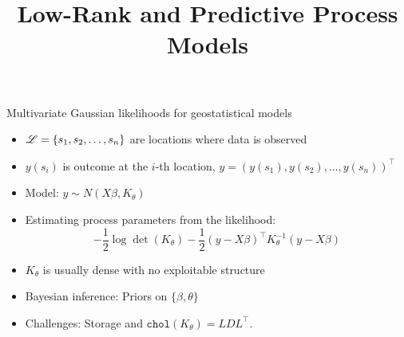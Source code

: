 





\title[]{Low-Rank and Predictive Process Models}




\maketitle


\begin{frame}{Multivariate Gaussian likelihoods for geostatistical models}

 \begin{itemize}\setlength{\itemsep}{0.4cm}
  \item ${\cal L}=\{s_1,s_2,\ldots,s_n\}$ are locations where data is observed
  \item $y(s_i)$ is outcome at the $i$-th location, $y=(y(s_1),y(s_2),\ldots,y(s_n))^{\top}$ 
  \item Model: $y \sim N(X\beta, K_{\theta})$
  \item Estimating process parameters from the likelihood:
  \[
   -\frac{1}{2}\log\det(K_{\theta}) - \frac{1}{2}(y-X\beta)^{\top}K_{\theta}^{-1}(y-X\beta)
  \]
    \item $K_{\theta}$ is usually dense with no exploitable structure
  \item Bayesian inference: Priors on $\{\beta,\theta\}$
  \item Challenges: Storage and $\texttt{chol}(K_{\theta}) = LDL^{\top}$.
 \end{itemize}

\end{frame}

